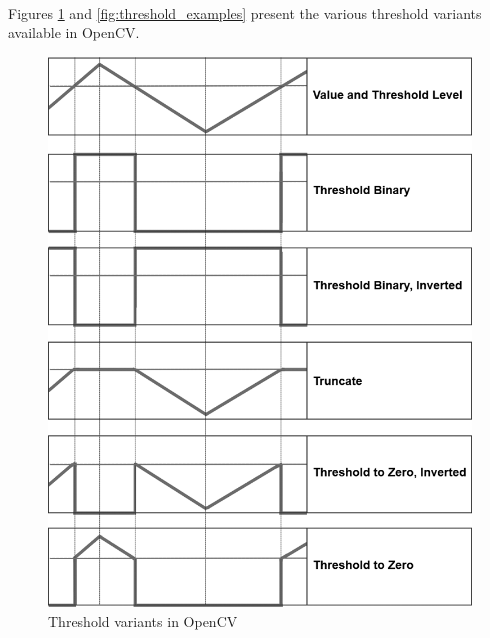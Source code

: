 \paragraph{}
Figures \ref{fig:threshold_variants} and \ref{fig:threshold_examples} present the various threshold variants available in OpenCV.

\begin{figure}[H]
	\centering
	\includegraphics[width=\textwidth]{images/thresholds}
	\caption{Threshold variants in OpenCV}
	\label{fig:threshold_variants}
\end{figure}

